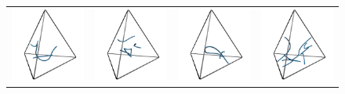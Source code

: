 %
\begin{figure}[tb]
    \centering
    \begin{tabular}{cccc}
        \rule[-0.5cm]{0pt}{0pt}
        \includegraphics[width=0.45\columnwidth]{figures/Rand_general_1.png} &
        \includegraphics[width=0.45\columnwidth]{figures/Rand_general_2.png} &
        \includegraphics[width=0.45\columnwidth]{figures/Rand_general_3.png} &
        \includegraphics[width=0.45\columnwidth]{figures/Rand_general_4.png} \\

\end{tabular}
\end{figure}

